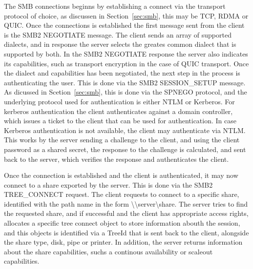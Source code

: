 \documentclass[english, 12pt, a4paper, elec, utf8, a-2b, online]{aaltothesis}
\begin{document}
The SMB connections beginns by establishing a connect via the transport protocol
of choice, as discussen in Section~\ref{sec:smb}, this may be TCP, RDMA or QUIC.
Once the connections is established the first message sent from the client is
the SMB2 NEGOTIATE message. The client sends an array of supported dialects,
and in response the server selects the greates common dialect that is supported
by both. In the SMB2 NEGOTIATE response the server also indicates its capabilities,
such as transport encryption in the case of QUIC transport. Once the dialect and
capabilities has been negotiated, the next step in the process is authenticating
the user. This is done via the SMB2 SESSION\_SETUP message. As dicussed in Scetion~\ref{sec:smb},
this is done via the SPNEGO protocol, and the underlying protocol used for authentication
is either NTLM or Kerberos. For kerberos authentication the client authenticates
against a domain controller, which issues a ticket to the client that can be used for
authentication. In case Kerberos authentication is not available, the client may
authenticate via NTLM. This works by the server sending a challenge to the client,
and using the client password as a shared secret, the response to the challenge is
calculated, and sent back to the server, which verifies the response and authenticates
the client\cite{smb2_tech}.

Once the connection is established and the client is authenticated, it may now connect
to a share exported by the server. This is done via the SMB2 TREE\_CONNECT request.
The client requests to connect to a specific share, identified with the path name
in the form {\textbackslash\textbackslash}server{\textbackslash}share. The server
tries to find the requested share, and if successful and the client has appropriate
access rights, allocates a specific tree connect object to store information abouth the session,
and this objects is identified via a TreeId that is sent back to the client, alongside
the share type, disk, pipe or printer. In addition,
the server returns information about the share capabilities, suchs a continous availability
or scaleout capabilities\cite{smb2_tech}.
\end{document}
